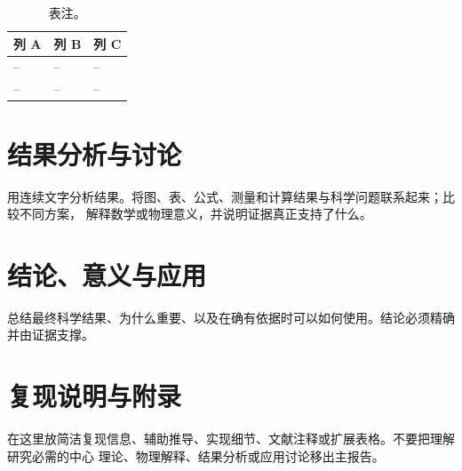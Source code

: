 \documentclass[11pt,a4paper]{ctexart}
\newif\ifQiushiHasCitations
\begin{document}
\begin{table}[htbp]
\caption{表注。}
\label{tab:report-example-zh}
\begin{tabularx}{\textwidth}{YYY}
\toprule
列 A & 列 B & 列 C \\
\midrule
-- & -- & -- \\
-- & -- & -- \\
\bottomrule
\end{tabularx}
\end{table}

\section{结果分析与讨论}

用连续文字分析结果。将图、表、公式、测量和计算结果与科学问题联系起来；比较不同方案，
解释数学或物理意义，并说明证据真正支持了什么。

\section{结论、意义与应用}

总结最终科学结果、为什么重要、以及在确有依据时可以如何使用。结论必须精确并由证据支撑。

\appendix
\section{复现说明与附录}

在这里放简洁复现信息、辅助推导、实现细节、文献注释或扩展表格。不要把理解研究必需的中心
理论、物理解释、结果分析或应用讨论移出主报告。


\ifQiushiHasCitations
  \IfFileExists{refs.bib}{%
    
    }{}
\fi
\end{document}
